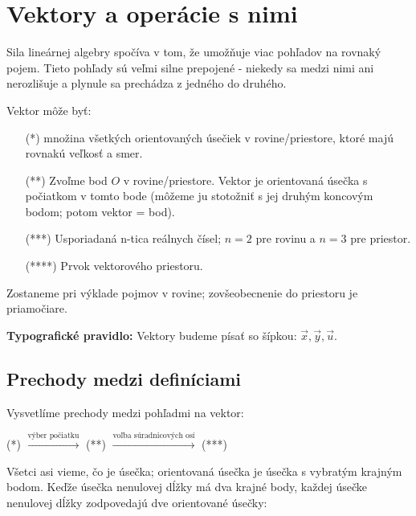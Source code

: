 \documentclass[11pt]{article}
\title{}
\author{}
\date{}
\renewcommand{\vec}[1]{\overrightarrow{#1}}
\begin{document}
\section{Vektory a operácie s nimi}

Sila lineárnej algebry spočíva v tom, že umožňuje viac pohľadov na rovnaký pojem. Tieto pohľady sú veľmi silne prepojené - niekedy sa medzi nimi ani nerozlišuje a plynule sa prechádza z jedného do druhého.

\noindent Vektor môže byť:
\begin{itemize}
    \item[(*)] množina všetkých orientovaných úsečiek v rovine/priestore, ktoré majú rovnakú veľkosť a smer.
    \item[(**)] Zvoľme bod $O$ v rovine/priestore. Vektor je orientovaná úsečka s počiatkom v tomto bode (môžeme ju stotožniť s jej druhým koncovým bodom; potom vektor = bod).
    \item[(***)] Usporiadaná n-tica reálnych čísel; $n=2$ pre rovinu a $n=3$ pre priestor.
    \item[(****)] Prvok vektorového priestoru.
\end{itemize}

Zostaneme pri výklade pojmov v rovine; zovšeobecnenie do priestoru je priamočiare.

\noindent \textbf{Typografické pravidlo:}
Vektory budeme písať so šípkou: $\vec{x}, \vec{y}, \vec{u}$.

\hrulefill

\subsection{Prechody medzi definíciami}
Vysvetlíme prechody medzi pohľadmi na vektor:
\begin{center}
    (*) $\xrightarrow{\text{výber počiatku}}$ (**) $\xrightarrow{\text{voľba súradnicových osí}}$ (***)
\end{center}

Všetci asi vieme, čo je úsečka; orientovaná úsečka je úsečka s vybratým krajným bodom. Keďže úsečka nenulovej dĺžky má dva krajné body, každej úsečke nenulovej dĺžky zodpovedajú dve orientované úsečky:

\begin{center}
\end{center}
\end{document}
